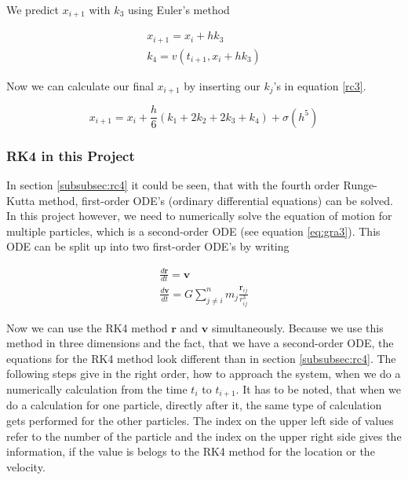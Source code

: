 \documentclass[10pt,a4paper]{article}
\begin{document}
We predict $x_{i+1}$ with $k_3$ using Euler's method

\begin{align}
x_{i+1} = x_i + h k_3 \\
k_4 = v(t_{i+1}, x_i + h k_3)
\end{align}

Now we can calculate our final $x_{i+1}$ by inserting our $k_j$'s in equation \eqref{rc3}.

\begin{equation}
\label{rc9}
x_{i+1} =  x_i + \frac{h}{6} (k_1 + 2 k_2 + 2 k_3 + k_4) + \sigma(h^5)
\end{equation}

\subsubsection{RK4 in this Project}

In section \ref{subsubsec:rc4} it could be seen, that with the fourth order Runge-Kutta method, first-order ODE's (ordinary differential equations) can be solved. In this project however, we need to numerically solve the equation of motion for multiple particles, which is a second-order ODE (see equation \eqref{eq:gra3}). This ODE can be split up into two first-order ODE's by writing

\begin{align}
\frac{d\mathbf{r}}{dt} = \mathbf{v}  \\
\frac{d\mathbf{v}}{dt} = G \sum_{j \neq i}^{n} m_j \frac{\mathbf{r}_{ij}}{r_{ij}^3}
\end{align}

Now we can use the RK4 method $\mathbf{r}$ and $\mathbf{v}$ simultaneously. Because we use this method in three dimensions and the fact, that we have a second-order ODE, the equations for the RK4 method look different than in section \ref{subsubsec:rc4}. The following steps give in the right order, how to approach the system, when we do a numerically calculation from the time $t_i$ to $t_{i+1}$. It has to be noted, that when we do a calculation for one particle, directly after it, the same type of calculation gets performed for the other particles. The index on the upper left side of values refer to the number of the particle and the index on the upper right side gives the information, if the value is belogs to the RK4 method for the location or the velocity.
\end{document}
